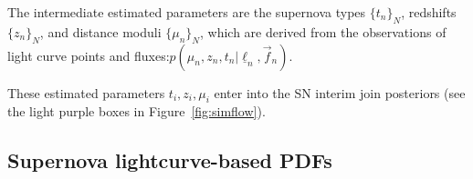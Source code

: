 \documentclass[12pt, twocolumn]{emulateapj}
\newcommand{\textul}{\underline}
\begin{document}

The intermediate estimated parameters are the supernova types $\{t_{n}\}_{N}$, redshifts $\{z_{n}\}_{N}$, and distance moduli $\{\mu_{n}\}_{N}$, which are derived from the observations of light curve points and fluxes:$p(\mu_{n}, z_{n}, t_{n} | \textul{\ell}_{n}, \vec{f}_{n})$. 

These estimated parameters $t_i,z_i,\mu_i$ enter into the SN interim join posteriors (see the light purple boxes in Figure~\ref{fig:simflow}).






\subsection{Supernova lightcurve-based PDFs}
\label{sec:snlcpdf}
\end{document}
